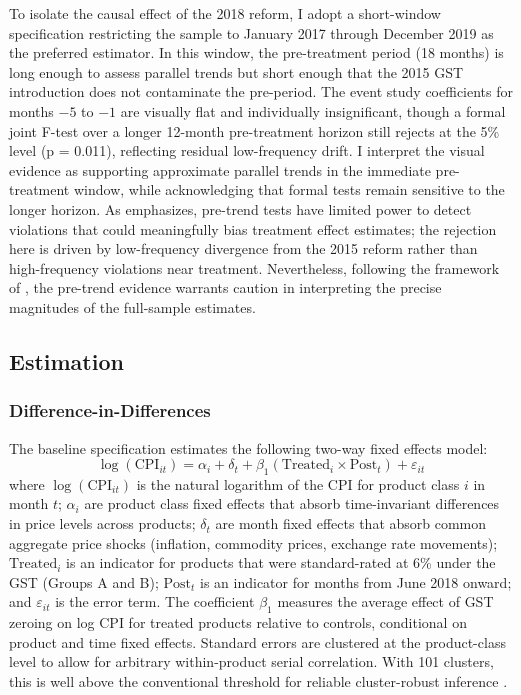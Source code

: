 \documentclass[12pt]{article}
\begin{document}
To isolate the causal effect of the 2018 reform, I adopt a short-window specification restricting the sample to January 2017 through December 2019 as the preferred estimator. In this window, the pre-treatment period (18 months) is long enough to assess parallel trends but short enough that the 2015 GST introduction does not contaminate the pre-period. The event study coefficients for months $-5$ to $-1$ are visually flat and individually insignificant, though a formal joint F-test over a longer 12-month pre-treatment horizon still rejects at the 5\% level (p = 0.011), reflecting residual low-frequency drift. I interpret the visual evidence as supporting approximate parallel trends in the immediate pre-treatment window, while acknowledging that formal tests remain sensitive to the longer horizon. As \citet{roth2022} emphasizes, pre-trend tests have limited power to detect violations that could meaningfully bias treatment effect estimates; the rejection here is driven by low-frequency divergence from the 2015 reform rather than high-frequency violations near treatment. Nevertheless, following the framework of \citet{rambachan2023}, the pre-trend evidence warrants caution in interpreting the precise magnitudes of the full-sample estimates.

\subsection{Estimation}

\subsubsection{Difference-in-Differences}

The baseline specification estimates the following two-way fixed effects model:
\begin{equation}
\log(\text{CPI}_{it}) = \alpha_i + \delta_t + \beta_1 (\text{Treated}_i \times \text{Post}_t) + \varepsilon_{it}
\label{eq:did}
\end{equation}
where $\log(\text{CPI}_{it})$ is the natural logarithm of the CPI for product class $i$ in month $t$; $\alpha_i$ are product class fixed effects that absorb time-invariant differences in price levels across products; $\delta_t$ are month fixed effects that absorb common aggregate price shocks (inflation, commodity prices, exchange rate movements); $\text{Treated}_i$ is an indicator for products that were standard-rated at 6\% under the GST (Groups A and B); $\text{Post}_t$ is an indicator for months from June 2018 onward; and $\varepsilon_{it}$ is the error term. The coefficient $\beta_1$ measures the average effect of GST zeroing on log CPI for treated products relative to controls, conditional on product and time fixed effects. Standard errors are clustered at the product-class level to allow for arbitrary within-product serial correlation. With 101 clusters, this is well above the conventional threshold for reliable cluster-robust inference \citep{cameron2008}.
\end{document}
